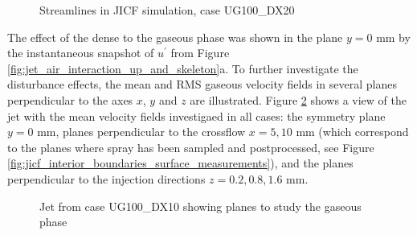 \begin{figure}[h!]
	\centering
	\vspace*{-0.5in}
	\caption{Streamlines in JICF simulation, case UG100\_DX20}
		\label{fig:streamlines_UG100_DX20_from_dump}
\end{figure}


The effect of the dense to the gaseous phase was shown in the plane $y = 0$ mm by the instantaneous snapshot of $u^{\prime}$ from Figure \ref{fig:jet_air_interaction_up_and_skeleton}a. To further investigate the disturbance effects, the mean and RMS gaseous velocity fields in several planes perpendicular to the axes $x$, $y$ and $z$ are illustrated. Figure \ref{fig:jicf_sps_with_gaseous_planes} shows a view of the jet with the mean velocity fields investigaed in all cases: the symmetry plane $y = 0$ mm, planes perpendicular to the crossflow $x = 5, 10$ mm (which correspond to the planes where spray has been sampled and postprocessed, see Figure \ref{fig:jicf_interior_boundaries_surface_measurements}), and the planes perpendicular to the injection directions $z = 0.2, 0.8, 1.6$ mm. 


\begin{figure}[h!]
	\centering
	\caption{Jet from case UG100\_DX10 showing planes to study the gaseous phase}
	\label{fig:jicf_sps_with_gaseous_planes}
\end{figure}



